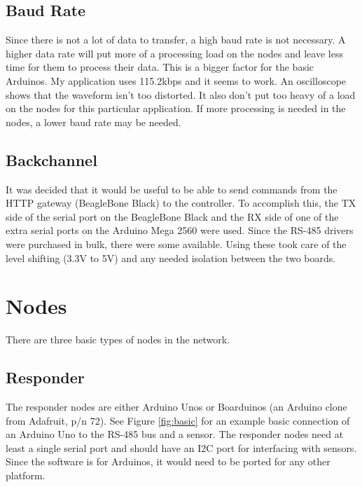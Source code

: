 \documentclass[10pt]{article}
\begin{document}
\subsection{Baud Rate}
Since there is not a lot of data to transfer, a high baud rate is not necessary.  A higher data rate will put more of a processing load on the nodes and leave less time for them to process their data.  This is a bigger factor for the basic Arduinos.  My application uses 115.2kbps and it seems to work.  An oscilloscope shows that the waveform isn't too distorted.  It also don't put too heavy of a load on the nodes for this particular application.  If more processing is needed in the nodes, a lower baud rate may be needed.

\subsection{Backchannel}
It was decided that it would be useful to be able to send commands from the HTTP gateway (BeagleBone Black) to the controller.  To accomplish this, the TX side of the serial port on the BeagleBone Black and the RX side of one of the extra serial ports on the Arduino Mega 2560 were used.  Since the RS-485 drivers were purchased in bulk, there were some available.  Using these took care of the level shifting (3.3V to 5V) and any needed isolation between the two boards.

\section{Nodes}
There are three basic types of nodes in the network.

\subsection{Responder}
The responder nodes are either Arduino Unos or Boarduinos (an Arduino clone from Adafruit, p/n 72).  See Figure \ref{fig:basic} for an example basic connection of an Arduino Uno to the RS-485 bus and a sensor.  The responder nodes need at least a single serial port and should have an I2C port for interfacing with sensors.  Since the software is for Arduinos, it would need to be ported for any other platform.
\end{document}
